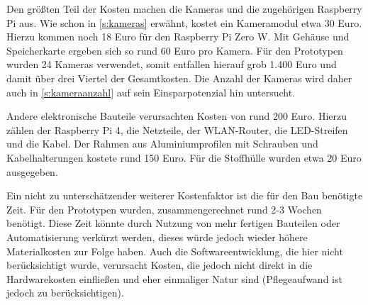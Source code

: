 \documentclass[./00PhotoBox.tex]{subfiles}
\begin{document}
Den größten Teil der Kosten machen die Kameras und die zugehörigen Raspberry Pi  aus. Wie schon in \autoref{s:kameras} erwähnt, kostet ein Kameramodul etwa 30 Euro. Hierzu kommen noch 18 Euro für den Raspberry Pi Zero W. Mit Gehäuse und Speicherkarte ergeben sich so rund 60 Euro pro Kamera. Für den Prototypen wurden 24 Kameras verwendet, somit entfallen hierauf grob 1.400 Euro und damit über drei Viertel der Gesamtkosten. Die Anzahl der Kameras wird daher auch in \autoref{s:kameraanzahl} auf sein Einsparpotenzial hin untersucht.

Andere elektronische Bauteile verursachten Kosten von rund 200 Euro. Hierzu zählen der Raspberry Pi 4, die Netzteile, der WLAN-Router, die LED-Streifen und die Kabel. Der Rahmen aus Aluminiumprofilen mit Schrauben und Kabelhalterungen kostete rund 150 Euro. Für die Stoffhülle wurden etwa 20 Euro ausgegeben.

Ein nicht zu unterschätzender weiterer Kostenfaktor ist die für den Bau benötigte Zeit. Für den Prototypen wurden, zusammengerechnet rund 2-3 Wochen benötigt. Diese Zeit könnte durch Nutzung von mehr fertigen Bauteilen oder Automatisierung verkürzt werden, dieses würde jedoch wieder höhere Materialkosten zur Folge haben. Auch die Softwareentwicklung, die hier nicht berücksichtigt wurde, verursacht Kosten, die jedoch nicht direkt in die Hardwarekosten einfließen und eher einmaliger Natur sind (Pflegeaufwand ist jedoch zu berücksichtigen).

\biblio
\end{document}
